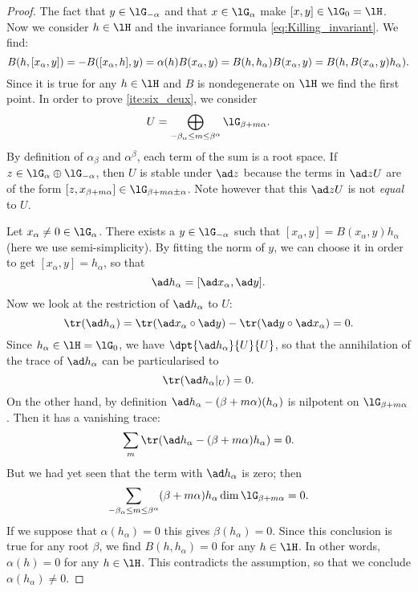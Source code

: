 \begin{proof}
The fact that $y\in\lG_{-\alpha}$ and that $x\in\lG_{\alpha}$ make $[x,y]\in\lG_0=\lH$. Now we consider $h\in\lH$ and the invariance formula \eqref{eq:Killing_invariant}. We find:
\begin{equation}
B(h,[x_{\alpha},y])=-B([x_{\alpha},h],y)\\
        =\alpha(h)B(x_{\alpha},y)\\
        =B(h,h_{\alpha})B(x_{\alpha},y)\\
        =B(h,B(x_{\alpha},y)h_{\alpha}).
\end{equation}
Since it is true for any $h\in\lH$ and $B$ is nondegenerate on $\lH$ we find the first point. In order to prove \ref{ite:six_deux}, we consider
\[
U=\bigoplus_{-\beta_{\alpha}\leq m\leq\beta^{\alpha}}\lG_{\beta+m\alpha}.
\]
By definition of $\alpha_{\beta}$ and $\alpha^{\beta}$, each term of the sum is a root space. If $z\in\lG_{\alpha}\oplus\lG_{-\alpha}$, then $U$ is stable under $\ad z$ because the terms in $\ad z U$ are of the form $[z,x_{\beta+m\alpha}]\in\lG_{\beta+m\alpha\pm\alpha}$. Note however that this $\ad z U$ is not \emph{equal} to $U$.

Let $x_{\alpha}\neq 0\in\lG_{\alpha}$. There exists a $y\in\lG_{-\alpha}$ such that $[x_{\alpha},y]=B(x_{\alpha},y)h_{\alpha}$ (here we use semi-simplicity). By fitting the norm of $y$, we can choose it in order to get  $[x_{\alpha},y]=h_{\alpha}$, so that 
\[
\ad h_{\alpha}=[\ad x_{\alpha},\ad y].
\]
Now we look at the restriction of $\ad h_{\alpha}$ to $U$:
\begin{equation}
\tr(\ad h_{\alpha})=\tr(\ad x_{\alpha}\circ\ad y)-\tr(\ad y\circ\ad x_{\alpha})=0.
\end{equation}
Since $h_{\alpha}\in\lH=\lG_0$, we have $\dpt{\ad h_{\alpha}}{U}{U}$, so that the annihilation of the trace of $\ad h_{\alpha}$ can be particularised to 
\[
\tr(\ad h_{\alpha}|_U)=0.
\]
On the other hand, by definition $\ad h_{\alpha}-(\beta+m\alpha)(h_{\alpha})$ is nilpotent on $\lG_{\beta+m\alpha}$. Then it has a vanishing trace:
\[
\sum_m\tr( \ad h_{\alpha}-(\beta+m\alpha)h_{\alpha}  )=0.
\]
But we had yet seen that the term with $\ad h_{\alpha}$ is zero; then
\begin{equation}\label{eq:trace_U}
\sum_{-\beta_{\alpha}\leq m\leq \beta^{\alpha}} (\beta+m\alpha)h_{\alpha}\dim\lG_{\beta+m\alpha}=0.
\end{equation}
If we suppose that $\alpha(h_{\alpha})=0$ this gives $\beta(h_{\alpha})=0$. Since this conclusion is true for any root $\beta$, we find $B(h,h_{\alpha})=0$ for any $h\in\lH$. In other words, $\alpha(h)=0$ for any $h\in\lH$. This contradicts the assumption, so that we conclude $\alpha(h_{\alpha})\neq 0$.



\end{proof}
